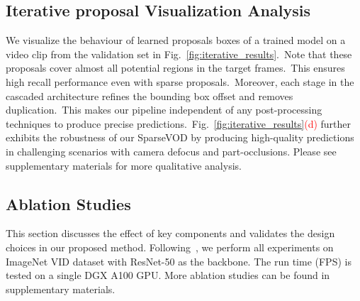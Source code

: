 \documentclass{bmvc2k}
\begin{document}
\subsection{Iterative proposal Visualization Analysis}
\label{subsec:qualitative}
\vspace{-5pt}
We visualize the behaviour of learned proposals boxes of a trained model on a video clip from the validation set in Fig.~\ref{fig:iterative_results}.~Note that these proposals cover almost all potential regions in the target frames.~This ensures high recall performance even with sparse proposals.~Moreover, each stage in the cascaded architecture refines the bounding box offset and removes duplication.~This makes our pipeline independent of any post-processing techniques to produce precise predictions.~Fig.~\ref{fig:iterative_results}\textcolor{red}{(d)} further exhibits the robustness of our SparseVOD by producing high-quality predictions in challenging scenarios with camera defocus and part-occlusions. Please see supplementary materials for more qualitative analysis. \vspace{-5pt}

\subsection{Ablation Studies}
\label{subsec:ablation}
\vspace{-5pt}
This section discusses the effect of key components and validates the design choices in our proposed method. Following~\cite{he2021end}, we perform all experiments on ImageNet VID dataset with ResNet-50 as the backbone. The run time (FPS) is tested on a single DGX A100 GPU. More ablation studies can be found in supplementary materials.
\end{document}
